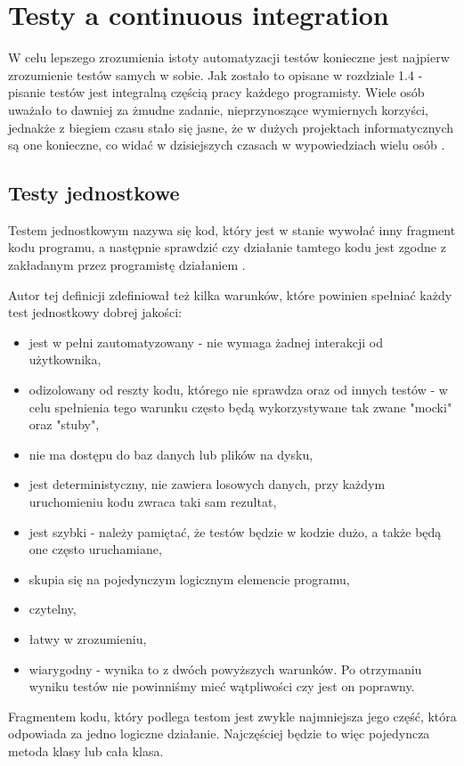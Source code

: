 \section{Testy a continuous integration}
W celu lepszego zrozumienia istoty automatyzacji testów konieczne jest najpierw zrozumienie testów samych w sobie. Jak zostało to opisane w rozdziale 1.4 - pisanie testów jest integralną częścią pracy każdego programisty. Wiele osób uważało to dawniej za żmudne zadanie, nieprzynoszące wymiernych korzyści, jednakże z biegiem czasu stało się jasne, że w dużych projektach informatycznych są one konieczne, co widać w dzisiejszych czasach w wypowiedziach wielu osób \cite{UnitOpinions} \cite{UnitResults}.

\subsection{Testy jednostkowe}
Testem jednostkowym nazywa się kod, który jest w stanie wywołać inny fragment kodu programu, a następnie sprawdzić czy działanie tamtego kodu jest zgodne z zakładanym przez programistę działaniem \cite{UnitDefinition}.
\par Autor tej definicji zdefiniował też kilka warunków, które powinien spełniać każdy test jednostkowy dobrej jakości: 
\begin{itemize}
    \item jest w pełni zautomatyzowany - nie wymaga żadnej interakcji od użytkownika,
    \item odizolowany od reszty kodu, którego nie sprawdza oraz od innych testów - w celu spełnienia tego warunku często będą wykorzystywane tak zwane "mocki" oraz "stuby",
    \item nie ma dostępu do baz danych lub plików na dysku,
    \item jest deterministyczny, nie zawiera losowych danych, przy każdym uruchomieniu kodu zwraca taki sam rezultat,
    \item jest szybki - należy pamiętać, że testów będzie w kodzie dużo, a także będą one często uruchamiane,
    \item skupia się na pojedynczym logicznym elemencie programu,
    \item czytelny,
    \item łatwy w zrozumieniu,
    \item wiarygodny - wynika to z dwóch powyższych warunków. Po otrzymaniu wyniku testów nie powinniśmy mieć wątpliwości czy jest on poprawny.
\end{itemize}
Fragmentem kodu, który podlega testom jest zwykle najmniejsza jego część, która odpowiada za jedno logiczne działanie. Najczęściej będzie to więc pojedyncza metoda klasy lub cała klasa. 


